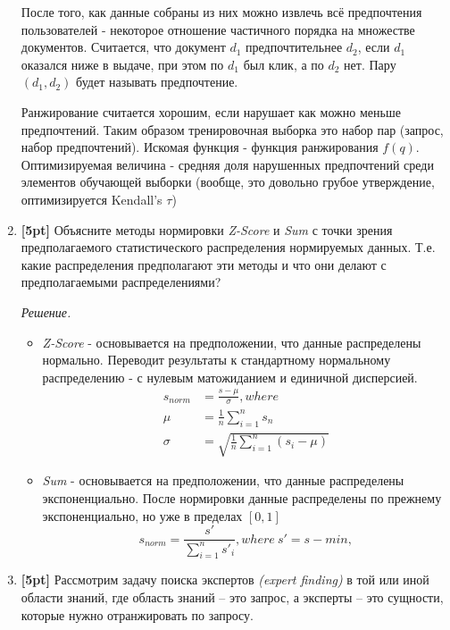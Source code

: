 \begin{enumerate}
	После того, как данные собраны из них можно извлечь всё предпочтения пользователей - некоторое 
	отношение частичного порядка на множестве документов. Считается, что документ $d_1$ 
	предпочтительнее $d_2$, если $d_1$ оказался ниже в выдаче, при этом по $d_1$ был клик, а по 
	$d_2$ нет. Пару $(d_1, d_2)$ будет называть предпочтение.
	
	Ранжирование считается хорошим, если нарушает как можно меньше предпочтений. Таким образом 
	тренировочная выборка это набор пар (запрос, набор предпочтений). Искомая функция - функция 
	ранжирования $f(q)$. Оптимизируемая величина - средняя доля нарушенных предпочтений среди 
	элементов обучающей выборки (вообще, это довольно грубое утверждение, оптимизируется Kendall's 
	$\tau$)
	
	\item \textbf{[5pt]} Объясните методы нормировки \textit{Z-Score} и \textit{Sum} с точки 
	зрения предполагаемого статистического распределения нормируемых данных. Т.е. какие 
	распределения предполагают эти методы и что они делают с предполагаемыми распределениями?
	
	\textit{Решение.}
	\begin{itemize}
		\item \textit{Z-Score} - основывается на предположении, что данные распределены нормально. Переводит результаты к стандартному нормальному распределению - с нулевым матожиданием и единичной дисперсией.
		\begin{align*}
			s_{norm} &= \frac{s - \mu}{\sigma}, where\\
			\mu &= \frac{1}{n} \sum\limits_{i = 1}^n s_n\\
			\sigma &= \sqrt{\frac{1}{n} \sum\limits_{i = 1}^n (s_i - \mu)}
		\end{align*}
		
		\item \textit{Sum} - основывается на предположении, что данные распределены экспоненциально. После нормировки данные распределены по прежнему экспоненциально, но уже в пределах $[0, 1]$
		\begin{equation*}
			s_{norm} = \frac{s'}{\sum\limits_{i = 1}^{n}s'_i}, where \ s' = s - min, 
		\end{equation*}
	\end{itemize}
	
	
	\item \textbf{[5pt]} Рассмотрим задачу поиска экспертов \textit{(expert finding)} в той или 
	иной области знаний, где область знаний – это запрос, а эксперты – это сущности, которые нужно 
	отранжировать по запросу.
		

\end{enumerate}
